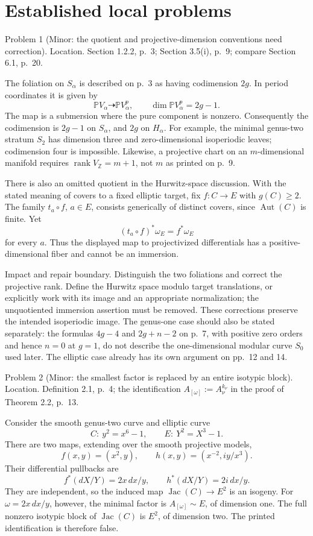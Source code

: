 \documentclass[10pt]{article}
\begin{document}
\section*{Established local problems}
Problem 1 (Minor: the quotient and projective-dimension conventions need correction).  Location. Section 1.2.2, p. 3; Section 3.5(i), p. 9; compare Section 6.1, p. 20.\par
The foliation on \(S_\alpha\) is described on p. 3 as having codimension \(2g\). In period coordinates it is given by \[\mathbb P V_\alpha\dashrightarrow\mathbb P V_\alpha^p,
 \qquad \dim\mathbb P V_\alpha^p=2g-1.\] The map is a submersion where the pure component is nonzero. Consequently the codimension is \(2g-1\) on \(S_\alpha\), and \(2g\) on \(H_\alpha\). For example, the minimal genus-two stratum \(S_2\) has dimension three and zero-dimensional isoperiodic leaves; codimension four is impossible. Likewise, a projective chart on an \(m\)-dimensional manifold requires \(\operatorname{rank}V_\mathbb Z=m+1\), not \(m\) as printed on p. 9.\par
There is also an omitted quotient in the Hurwitz-space discussion. With the stated meaning of covers to a fixed elliptic target, fix \(f:C\to E\) with \(g(C)\ge2\). The family \(t_a\circ f\), \(a\in E\), consists generically of distinct covers, since \(\operatorname{Aut}(C)\) is finite. Yet \[(t_a\circ f)^*\omega_E=f^*\omega_E\] for every \(a\). Thus the displayed map to projectivized differentials has a positive-dimensional fiber and cannot be an immersion.\par
Impact and repair boundary. Distinguish the two foliations and correct the projective rank. Define the Hurwitz space modulo target translations, or explicitly work with its image and an appropriate normalization; the unquotiented immersion assertion must be removed. These corrections preserve the intended isoperiodic image. The genus-one case should also be stated separately: the formulas \(4g-4\) and \(2g+n-2\) on p. 7, with positive zero orders and hence \(n=0\) at \(g=1\), do not describe the one-dimensional modular curve \(S_0\) used later. The elliptic case already has its own argument on pp. 12 and 14.\par
Problem 2 (Minor: the smallest factor is replaced by an entire isotypic block).  Location. Definition 2.1, p. 4; the identification \(A_{[\omega]}:=A_\nu^{k_\nu}\) in the proof of Theorem 2.2, p. 13.\par
Consider the smooth genus-two curve and elliptic curve \[C:\ y^2=x^6-1,\qquad E:\ Y^2=X^3-1.\] There are two maps, extending over the smooth projective models, \[f(x,y)=(x^2,y),\qquad
 h(x,y)=(x^{-2},iy/x^3).\] Their differential pullbacks are \[f^*(dX/Y)=2x\,dx/y,\qquad h^*(dX/Y)=2i\,dx/y.
 \tag{2.1}\] They are independent, so the induced map \(\operatorname{Jac}(C)\to E^2\) is an isogeny. For \(\omega=2x\,dx/y\), however, the minimal factor is \(A_{[\omega]}\sim E\), of dimension one. The full nonzero isotypic block of \(\operatorname{Jac}(C)\) is \(E^2\), of dimension two. The printed identification is therefore false.\par
\end{document}
